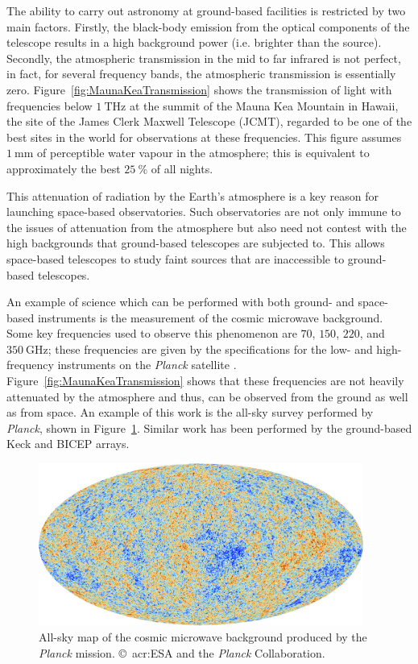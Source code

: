 \par
The ability to carry out astronomy at ground-based facilities is restricted by two main factors. Firstly, the black-body emission from the optical components of the telescope results in a high background power (i.e. brighter than the source). Secondly, the atmospheric transmission in the mid to far infrared is not perfect, in fact, for several frequency bands, the atmospheric transmission is essentially zero. Figure~\ref{fig:MaunaKeaTransmission} shows the transmission of light with frequencies below $1~\mathrm{THz}$ at the summit of the Mauna Kea Mountain in Hawaii, the site of the James Clerk Maxwell Telescope (JCMT), regarded to be one of the best sites in the world for observations at these frequencies. This figure assumes $1~\mathrm{mm}$ of perceptible water vapour in the atmosphere; this is equivalent to approximately the best $25~\%$ of all nights. 
\par 
This attenuation of radiation by the Earth's atmosphere is a key reason for launching space-based observatories. Such observatories are not only immune to the issues of attenuation from the atmosphere but also need not contest with the high backgrounds that ground-based telescopes are subjected to. This allows space-based telescopes to study faint sources that are inaccessible to ground-based telescopes. 
\par 
An example of science which can be performed with both ground- and space-based instruments is the measurement of the cosmic microwave background. Some key frequencies used to observe this phenomenon are $70$, $150$, $220$, and $350~\mathrm{GHz}$; these frequencies are given by the specifications for the low- and high-frequency instruments on the \textit{Planck} satellite \parencite{Valenziano2007,Lamarre2003}. Figure~\ref{fig:MaunaKeaTransmission} shows that these frequencies are not heavily attenuated by the atmosphere and thus, can be observed from the ground as well as from space. An example of this work is the all-sky survey performed by \textit{Planck}, shown in Figure~\ref{fig:Planck_CMB}. Similar work has been performed by the ground-based Keck and BICEP arrays.
\begin{figure}[tb]
\begin{center}
\includegraphics[width = 0.95\textwidth]{figures/Planck_CMB}
\caption[All-sky map of the cosmic microwave background produced by the \textit{Planck} mission]{All-sky map of the cosmic microwave background produced by the \textit{Planck} mission. \copyright~\gls{acr:ESA} and the \textit{Planck} Collaboration.}
\label{fig:Planck_CMB}
\end{center}
\end{figure}
